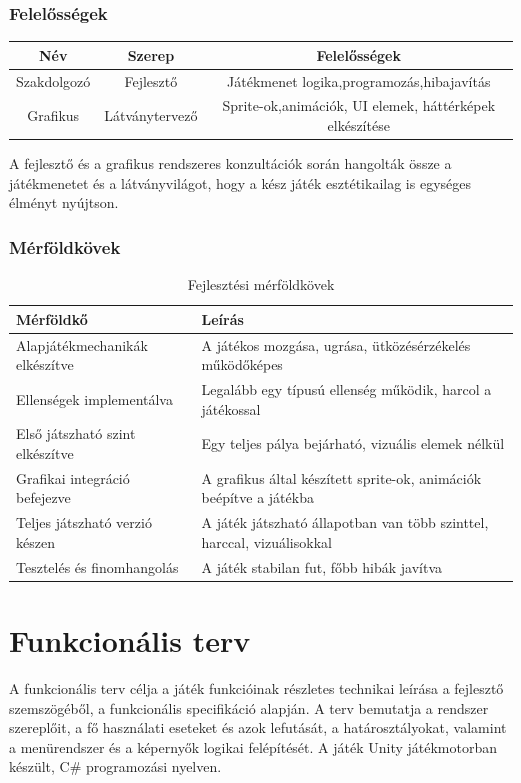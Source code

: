 \documentclass[
]{thesis-ekf}
\theoremstyle{definition}
\theoremstyle{remark}
\begin{document}
\subsubsection{Felelősségek}
\begin{tabular}{|c|c|c|}
	\hline
	Név & Szerep & Felelősségek\\
	\hline
	Szakdolgozó & Fejlesztő & Játékmenet logika,programozás,hibajavítás \\
	\hline
	Grafikus & Látványtervező & Sprite-ok,animációk, UI elemek, háttérképek elkészítése \\
	\hline
\end{tabular}
A fejlesztő és a grafikus rendszeres konzultációk során hangolták össze a játékmenetet és a látványvilágot, hogy a kész játék esztétikailag is egységes élményt nyújtson.

\subsubsection{Mérföldkövek}
\begin{table}[h!]
	\centering
	\begin{tabular}{|p{4cm}|p{12cm}|}
		\hline
		\textbf{Mérföldkő} & \textbf{Leírás} \\
		\hline
		Alapjátékmechanikák elkészítve & A játékos mozgása, ugrása, ütközésérzékelés működőképes \\
		\hline
		Ellenségek implementálva & Legalább egy típusú ellenség működik, harcol a játékossal \\
		\hline
		Első játszható szint elkészítve & Egy teljes pálya bejárható, vizuális elemek nélkül \\
		\hline
		Grafikai integráció befejezve & A grafikus által készített sprite-ok, animációk beépítve a játékba \\
		\hline
		Teljes játszható verzió készen & A játék játszható állapotban van több szinttel, harccal, vizuálisokkal \\
		\hline
		Tesztelés és finomhangolás & A játék stabilan fut, főbb hibák javítva \\
		\hline
	\end{tabular}
	\caption{Fejlesztési mérföldkövek}
\end{table}
\section{Funkcionális terv}
A funkcionális terv célja a játék funkcióinak részletes technikai leírása a fejlesztő szemszögéből, a funkcionális specifikáció alapján. A terv bemutatja a rendszer szereplőit, a fő használati eseteket és azok lefutását, a határosztályokat, valamint a menürendszer és a képernyők logikai felépítését. A játék Unity játékmotorban készült, C\# programozási nyelven.
\end{document}
